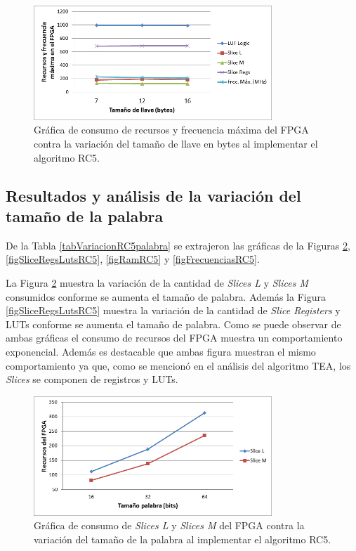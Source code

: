 \begin{figure}[H]
	\centering
	\includegraphics[width=0.8\textwidth]{./images/figLlaveRC5}
	\caption{Gráfica de consumo de recursos y frecuencia máxima del FPGA contra la variación del tamaño de llave en bytes al implementar el algoritmo RC5.}
	\label{figllaveRC5}
\end{figure}


\subsection{Resultados y análisis de la variación del tamaño de la palabra}
De la Tabla \ref{tabVariacionRC5palabra} se extrajeron las gráficas de la Figuras \ref{figSlicesRC5}, \ref{figSliceRegsLutsRC5}, \ref{figRamRC5} y \ref{figFrecuenciasRC5}. 

La Figura \ref{figSlicesRC5} muestra la variación de la cantidad de \textit{Slices L} y \textit{Slices M} consumidos conforme se aumenta el tamaño de palabra. Además la Figura \ref{figSliceRegsLutsRC5} muestra la variación de la cantidad de \textit{Slice Registers} y LUTs conforme se aumenta el tamaño de palabra. Como se puede observar de ambas gráficas el consumo de recursos del FPGA muestra un comportamiento exponencial. Además es destacable que ambas figura muestran el mismo comportamiento ya que, como se mencionó en el análisis del algoritmo TEA, los \textit{Slices} se componen de registros y LUTs.

\begin{figure}[H]
	\centering
	\includegraphics[width=0.8\textwidth]{./images/figSlicesRC5}
	\caption{Gráfica de consumo de \textit{Slices L} y \textit{Slices M} del FPGA contra la variación del tamaño de la palabra al implementar el algoritmo RC5.}
	\label{figSlicesRC5}
\end{figure}

